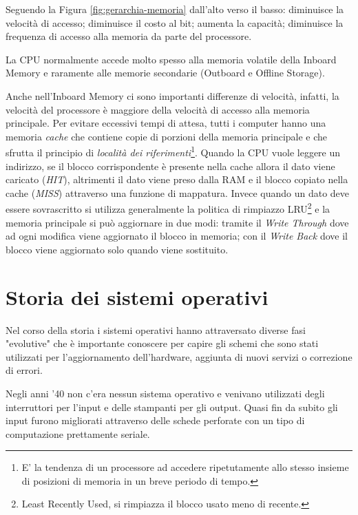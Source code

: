 Seguendo la Figura \ref{fig:gerarchia-memoria} dall’alto verso il basso: diminuisce la velocità di accesso; diminuisce il costo al bit; aumenta la capacità; diminuisce la frequenza di accesso alla memoria da parte del processore.

La CPU normalmente accede molto spesso alla memoria volatile della Inboard Memory e raramente alle memorie secondarie (Outboard e
Offline Storage).

Anche nell’Inboard Memory ci sono importanti differenze di velocità, infatti, la velocità del processore è maggiore della velocità di accesso alla memoria principale. Per evitare eccessivi tempi di attesa, tutti i computer hanno una memoria \textit{cache} che contiene copie di porzioni della memoria principale e che sfrutta il principio di \textit{località dei riferimenti}\footnote{E' la tendenza di un processore ad accedere ripetutamente allo stesso insieme di posizioni di memoria in un breve periodo di tempo.}. Quando la CPU vuole leggere un indirizzo, se il blocco corrispondente è presente nella cache allora il dato viene caricato (\textit{HIT}), altrimenti il dato viene preso dalla RAM e il blocco copiato nella cache (\textit{MISS}) attraverso una funzione di mappatura. Invece quando un dato deve essere sovrascritto si utilizza generalmente la politica di rimpiazzo LRU\footnote{Least Recently Used, si rimpiazza il blocco usato meno di recente.} e la memoria principale si può aggiornare in due modi: tramite il \textit{Write Through} dove ad ogni modifica viene aggiornato il blocco in memoria; con il \textit{Write Back} dove il blocco viene aggiornato solo quando viene sostituito.

\section{Storia dei sistemi operativi}
Nel corso della storia i sistemi operativi hanno attraversato diverse fasi "evolutive" che è importante conoscere per capire gli schemi che sono stati utilizzati per l'aggiornamento dell'hardware, aggiunta di nuovi servizi o correzione di errori.

Negli anni '40 non c'era nessun sistema operativo e venivano utilizzati degli interruttori per l'input e delle stampanti per gli output. Quasi fin da subito gli input furono migliorati attraverso delle schede perforate con un tipo di computazione prettamente seriale. 

